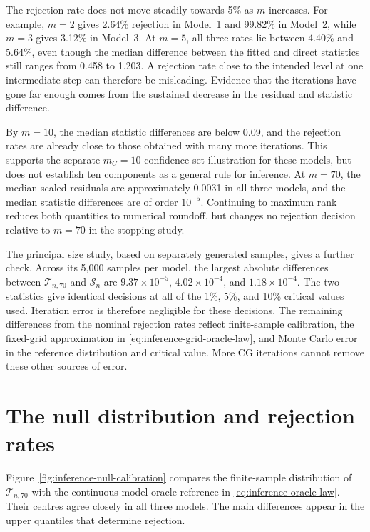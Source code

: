 The rejection rate does not move steadily towards 5\% as $m$ increases.
For example, $m=2$ gives 2.64\% rejection in Model~1 and 99.82\% in
Model~2, while $m=3$ gives 3.12\% in Model~3.  At $m=5$, all three rates
lie between 4.40\% and 5.64\%, even though the median difference between
the fitted and direct statistics still ranges from 0.458 to 1.203.  A
rejection rate close to the intended level at one intermediate step can
therefore be misleading.  Evidence that the iterations have gone far
enough comes from the sustained decrease in the residual and statistic
difference.

By $m=10$, the median statistic differences are below 0.09, and the
rejection rates are already close to those obtained with many more
iterations.  This supports the separate $m_C=10$ confidence-set
illustration for these models, but does not establish ten components as a
general rule for inference.  At $m=70$, the median scaled residuals are
approximately 0.0031 in all three models, and the median statistic
differences are of order $10^{-5}$.  Continuing to maximum rank reduces
both quantities to numerical roundoff, but changes no rejection decision
relative to $m=70$ in the stopping study.

The principal size study, based on separately generated samples, gives a
further check.  Across its 5,000 samples per model, the largest absolute
differences between $\mathcal T_{n,70}$ and $\mathcal S_n$ are
$9.37\times10^{-5}$, $4.02\times10^{-4}$, and $1.18\times10^{-4}$.
The two statistics give identical decisions at all of the 1\%, 5\%, and
10\% critical values used.  Iteration error is therefore negligible for
these decisions.  The remaining differences from the nominal rejection
rates reflect finite-sample calibration, the fixed-grid approximation in
\eqref{eq:inference-grid-oracle-law}, and Monte Carlo error in the reference
distribution and critical value.  More CG iterations cannot remove these
other sources of error.

\section{The null distribution and rejection rates}
\label{sec:inference-results-null}

Figure~\ref{fig:inference-null-calibration} compares the finite-sample
distribution of $\mathcal T_{n,70}$ with the continuous-model oracle reference
in \eqref{eq:inference-oracle-law}.  Their centres agree closely in all three
models.  The main differences appear in the upper quantiles that determine
rejection.

